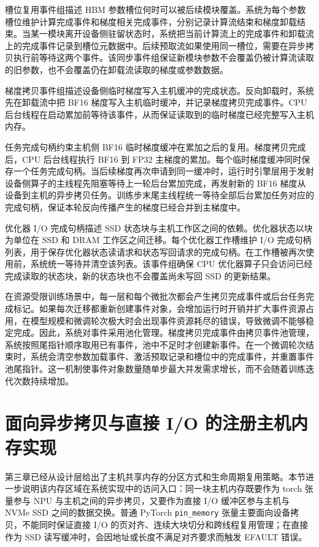 \documentclass[bachelor,openany,oneside,color,AutoFakeBold=true]{buaathesis}
\begin{document}
槽位复用事件组描述 HBM 参数槽位何时可以被后续模块覆盖。系统为每个参数槽位维护计算完成事件和梯度相关完成事件，分别记录计算流结束和梯度卸载结束。当某一模块离开设备侧驻留状态时，系统把当前计算流上的完成事件和卸载流上的完成事件记录到槽位元数据中。后续预取流如果使用同一槽位，需要在异步拷贝执行前等待这两个事件。该同步事件组保证新模块参数不会覆盖仍被计算流读取的旧参数，也不会覆盖仍在卸载流读取的梯度或参数数据。

梯度拷贝事件组描述设备侧临时梯度写入主机缓冲的完成状态。反向卸载时，系统先在卸载流中把 BF16 梯度写入主机临时缓冲，并记录梯度拷贝完成事件。CPU 后台线程在启动累加前等待该事件，从而保证读取到的临时梯度已经完整写入主机内存。

任务完成句柄约束主机侧 BF16 临时梯度缓冲在累加之后的复用。梯度拷贝完成后，CPU 后台线程执行 BF16 到 FP32 主梯度的累加。每个临时梯度缓冲同时保存一个任务完成句柄。当后续梯度再次申请到同一缓冲时，运行时引擎层用于发射设备侧算子的主线程先阻塞等待上一轮后台累加完成，再发射新的 BF16 梯度从设备到主机的异步拷贝任务。训练步末尾主线程统一等待全部后台累加任务对应的完成句柄，保证本轮反向传播产生的梯度已经合并到主梯度中。

优化器 I/O 完成句柄描述 SSD 状态块与主机工作区之间的依赖。优化器状态以块为单位在 SSD 和 DRAM 工作区之间迁移。每个优化器工作槽维护 I/O 完成句柄列表，用于保存优化器状态读请求和状态写回请求的完成句柄。在工作槽被再次使用前，系统统一等待并清空该列表。该事件组确保 CPU 优化器算子只会访问已经完成读取的状态块，新的状态块也不会覆盖尚未写回 SSD 的更新结果。

在资源受限训练场景中，每一层和每个微批次都会产生拷贝完成事件或后台任务完成标记。如果每次迁移都重新创建事件对象，会增加运行时开销并扩大事件资源占用，在模型规模和微调轮次极大时会出现事件资源耗尽的错误，导致微调不能够稳定完成。因此，系统对事件采用池化管理。梯度拷贝完成事件由拷贝事件池管理，系统按照尾指针顺序取用已有事件，池中不足时才创建新事件。在一个微调轮次结束时，系统会清空参数加载事件、激活预取记录和槽位中的完成事件，并重置事件池尾指针。这一机制使事件对象数量随单步最大并发需求增长，而不会随着训练迭代次数持续增加。

\section{面向异步拷贝与直接 I/O 的注册主机内存实现}
第三章已经从设计层给出了主机共享内存的分区方式和生命周期复用策略。本节进一步说明该内存区域在系统实现中的访问入口：同一块主机内存既要作为 torch 张量参与 NPU 与主机之间的异步拷贝，又要作为直接 I/O 缓冲区参与主机与 NVMe SSD 之间的数据交换。普通 PyTorch \texttt{pin\_memory} 张量主要面向设备拷贝，不能同时保证直接 I/O 的页对齐、连续大块切分和跨线程复用管理；在直接作为 SSD 读写缓冲时，会因地址或长度不满足对齐要求而触发 EFAULT 错误。
\end{document}
